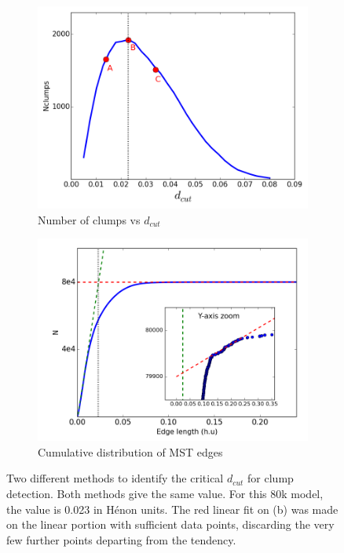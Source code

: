 \begin{figure}
    \centering
    \begin{subfigure}[b]{0.49\textwidth}
    	\centering
    	\includegraphics[width=\textwidth]{Figures/2_Ndcut.png}
        \caption{Number of clumps vs $d_{cut}$}
        \label{Fig:2_Ndcut}
    \end{subfigure}
    \begin{subfigure}[b]{0.49\textwidth}
    	\centering
    	\includegraphics[width=\textwidth]{Figures/2_dcutdistribution.png}
        \caption{Cumulative distribution of MST edges}
        \label{Fig:2_dcutcumulated}
    \end{subfigure}
\caption{Two different methods to identify the critical $d_{cut}$ for clump detection. Both methods give the same value. For this 80k model, the value is 0.023 in H\'enon units. The red linear fit on (b) was made on the linear portion with sufficient data points, discarding the very few further points departing from the tendency.}
\label{Fig:0_dcutchoice}
\end{figure}


